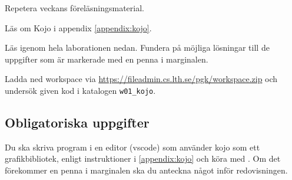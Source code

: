 
\Lab{\LabWeekONE}
%
\begin{Goals}

\end{Goals}

\begin{Preparations}
\item Repetera veckans föreläsningsmaterial.
\item {}
\item Läs om Kojo i appendix \ref{appendix:kojo}.
\item Läs igenom hela laborationen nedan. Fundera på möjliga lösningar till de uppgifter som är markerade med en penna i marginalen.
\item Ladda ned workspace via \url{https://fileadmin.cs.lth.se/pgk/workspace.zip} och undersök given kod i katalogen \texttt{w01\_kojo}.
\end{Preparations}

\subsection{Obligatoriska uppgifter}

Du ska skriva program i en editor (vscode) som använder kojo som ett grafikbibliotek, enligt instruktioner i \ref{appendix:kojo} och köra med . Om det förekommer en penna i marginalen ska du anteckna något inför redovisningen.


